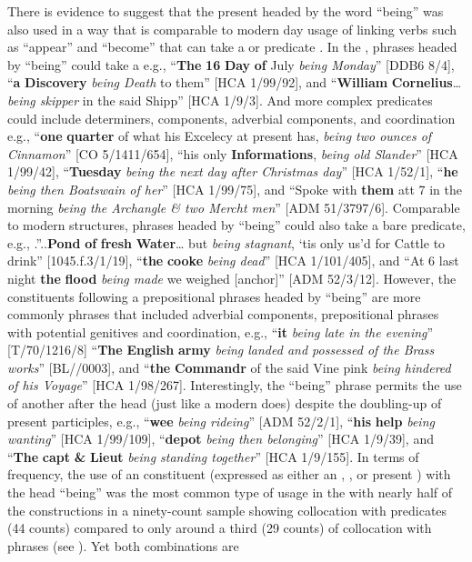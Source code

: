 There is evidence to suggest that the present  headed by the word “being” was also used in a way that is comparable to modern day usage of linking verbs such as “appear” and “become” that can take a  or predicate . In the ,  phrases headed by “being” could take a  e.g., “\textbf{The} \textbf{16} \textbf{Day} \textbf{of} July \textit{being Monday}” [DDB6 8/4], “\textbf{a} \textbf{Discovery} \textit{being Death} to them” [HCA 1/99/92], and “\textbf{William} \textbf{Cornelius}…\textit{being skipper} in the said Shipp” [HCA 1/9/3]. And more complex  predicates could include determiners,  components, adverbial components, and coordination e.g., “\textbf{one} \textbf{quarter} of what his Excelecy at present has, \textit{being two ounces of Cinnamon}” [CO 5/1411/654], “his only \textbf{Informations}, \textit{being old Slander}” [HCA 1/99/42], “\textbf{Tuesday} \textit{being the next day after Christmas day}” [HCA 1/52/1], “\textbf{he} \textit{being then Boatswain of her}” [HCA 1/99/75], and “Spoke with \textbf{them} att 7 in the morning \textit{being the Archangle \& two Mercht men}” [ADM 51/3797/6]. Comparable to modern  structures,  phrases headed by “being” could also take a bare  predicate, e.g., .”..\textbf{Pond} \textbf{of} \textbf{fresh} \textbf{Water}… but \textit{being stagnant}, ‘tis only us’d for Cattle to drink” [1045.f.3/1/19], “\textbf{the} \textbf{cooke} \textit{being dead}” [HCA 1/101/405], and “At 6 last night \textbf{the} \textbf{flood} \textit{being made} we weighed [anchor]” [ADM 52/3/12]. However, the  constituents following a prepositional phrases headed by “being” are more commonly  phrases that included adverbial components, prepositional phrases with potential genitives and coordination, e.g., “\textbf{it} \textit{being late in the evening}” [T/70/1216/8] “\textbf{The} \textbf{English} \textbf{army} \textit{being landed and possessed of the Brass works}” [BL/\citealt{Egerton2395}/0003], and “\textbf{the} \textbf{Commandr} of the said Vine pink \textit{being hindered of his Voyage}” [HCA 1/98/267]. Interestingly, the “being” phrase permits the use of another   after the  head (just like a modern  does) despite the doubling-up of present participles, e.g., “\textbf{wee} \textit{being rideing}” [ADM 52/2/1], “\textbf{his} \textbf{help} \textit{being wanting}” [HCA 1/99/109], “\textbf{depot} \textit{being then belonging}” [HCA 1/9/39], and “\textbf{The} \textbf{capt} \textbf{\&} \textbf{Lieut} \textit{being standing together}” [HCA 1/9/155]. In terms of frequency, the use of an  constituent (expressed as either an , , or present ) with the  head “being” was the most common type of usage in the  with nearly half of the constructions in a ninety-count sample showing collocation with  predicates (44 counts) compared to only around a third (29 counts) of collocation with  phrases (see ). Yet both combinations are 